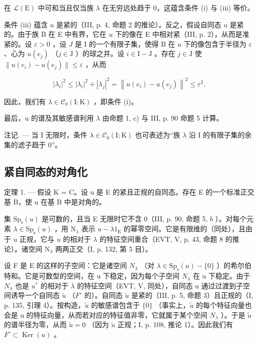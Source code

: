在 \(\mathcal{L}(\mathrm{E})\) 中可和当且仅当族 \(\lambda\) 在无穷远处趋于 0，这蕴含条件 (i) 与 (iii) 等价。

条件 (iii) 蕴含 \(u\) 是紧的（III, p. 4, 命题 2 的推论）。反之，假设自同态 \(u\) 是紧的。由于族 B 在 E 中有界，它在 \(u\) 下的像在 E 中相对紧（III, p. 2），从而是准紧的。设 \(\varepsilon > 0\) ，设 \(J\) 是 I 的一个有限子集，使得 B 在 \(u\) 下的像包含于半径为 \(\varepsilon\) 、心为 \(u(e_j)\) （\(j \in \mathrm{J}\) ）的球之并。设 \(i \in \mathrm{I} - \mathrm{J}\) 。存在 \(j \in \mathrm{J}\) 使 \(\| u(e_i) - u(e_j) \| \leqslant \varepsilon\) ，从而

\[
\left| \lambda_ {i} \right| ^ {2} \leqslant \left| \lambda_ {i} \right| ^ {2} + \left| \lambda_ {j} \right| ^ {2} = \left\| u \left(e _ {i}\right) - u \left(e _ {j}\right) \right\| ^ {2} \leqslant \varepsilon^ {2}.
\]

因此，我们有 \(\lambda \in \mathcal{C}_0(\mathrm{I};\mathrm{K})\) ，即条件 (i)。

最后，u 的谱及其敏感谱利用 \(\lambda\) 由命题 1, c) 与 III, p. 90 命题 5 计算。

注记. --- 当 I 无限时，条件 \(\lambda\in\mathcal{C}_{0}(\mathrm{I};\mathrm{K})\) 也可表述为“族 \(\lambda\) 沿 I 的有限子集的余集的滤子趋于 0”。

\subsection{紧自同态的对角化}

定理 1. --- 假设 K = C。设 u 是 E 的紧且正规的自同态。存在 E 的一个标准正交基 B，使 u 在基 B 中是对角的。

集 \(\mathrm{Sp}_{\mathrm{s}}(u)\) 是可数的，且当 E 无限时它不含 0（III, p. 90, 命题 5, \(b\) ）。对每个元素 \(\lambda \in \mathrm{Sp}_{\mathrm{s}}(u)\) ，用 \(\mathrm{N}_{\lambda}\) 表示 \(u - \lambda 1_{\mathrm{E}}\) 的幂零空间。它是有限维的（同处），且由于 \(u\) 正规，它与 \(u\) 的相对于 \(\lambda\) 的特征空间重合（EVT, V, p. 43, 命题 8 的推论）。诸空间 \(\mathrm{N}_{\lambda}\) 两两正交（I, p. 132, 第 5 目）。

设 F 是 E 的这样的子空间：它是诸空间 \(N_{\lambda}\) （对 \(\lambda \in \mathrm{Sp}_{\mathrm{s}}(u) - \{0\}\) ）的希尔伯特和。它是可数型的空间，在 u 下稳定，因为每个子空间 \(N_{\lambda}\) 在 u 下稳定。由于 \(N_{\lambda}\) 也是 \(u^{*}\) 的相对于 \(\overline{\lambda}\) 的特征空间（EVT, V, 同处），自同态 u 通过过渡到子空间诱导一个自同态 \(\widetilde{u}\) （\(F^{\circ}\) 的）。自同态 \(\widetilde{u}\) 是紧的（III, p. 5, 命题 3）且正规的（I, p. 135, 引理 4）。按构造，\(\widetilde{u}\) 的敏感谱包含于 \(\{0\}\) （事实上，\(\widetilde{u}\) 的每个特征向量也会是 u 的特征向量，从而若对应的特征值非零，它就属于某个空间 \(N_{\lambda}\) ）。于是 \(\widetilde{u}\) 的谱半径为零，从而 \(\widetilde{u}=0\) （因为 \(\widetilde{u}\) 正规；I, p. 108, 推论 1）。因此我们有 \(F^{\circ}\subset\operatorname{Ker}(u)\) 。

